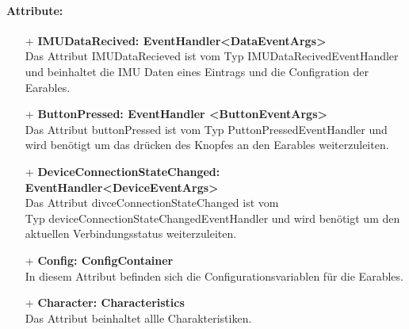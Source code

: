 \documentclass[a4paper,12pt]{article}
\begin{document}
\paragraph{Attribute:}
\begin{itemize}
	\item[+] \textbf{IMUDataRecived: EventHandler<DataEventArgs>}\\Das Attribut IMUDataRecieved ist vom Typ IMUDataRecivedEventHandler und beinhaltet die IMU Daten eines Eintrags und die Configration der Earables.
	\item[+] \textbf{ButtonPressed: EventHandler <ButtonEventArgs>}\\ Das Attribut buttonPressed ist vom Typ PuttonPressedEventHandler und wird benötigt um das drücken des Knopfes an den Earables weiterzuleiten.
	\item[+] \textbf{DeviceConnectionStateChanged: EventHandler<DeviceEventArgs>}\\ Das Attribut divceConnectionStateChanged ist vom \\Typ deviceConnectionStateChangedEventHandler und wird benötigt um den aktuellen Verbindungsstatus weiterzuleiten.
	\item[+] \textbf{Config: ConfigContainer}\\ In diesem Attribut befinden sich die Configurationsvariablen für die Earables.
	\item[+] \textbf{Character: Characteristics}\\ Das Attribut beinhaltet allle Charakteristiken.
\end{itemize}
\end{document}
